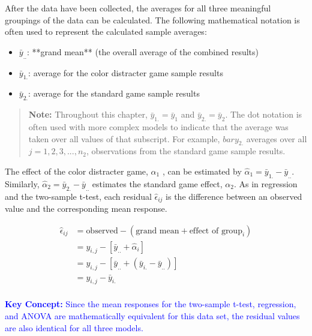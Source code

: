\documentclass[
]{report}
\begin{document}
After the data have been collected, the averages for all three meaningful groupings of the data can be calculated. The following mathematical notation is often used to represent the calculated sample averages:
\vspace{-1em}

\begin{itemize}
\item $\scriptstyle \bar{y}_{..}$: **grand mean** (the overall average of the combined results)
\item $\scriptstyle \bar{y}_{1.}$: average for the color distracter game sample results
\item $\scriptstyle \bar{y}_{2.}$: average for the standard game sample results
\end{itemize}

\begin{quote}
\textbf{Note:} Throughout this chapter, \(\scriptstyle \bar{y}_{1.} = \bar{y}_{1}\) and \(\scriptstyle \bar{y}_{2.} = \bar{y}_{2}\). The dot notation is often used with more complex models to indicate that the average was taken over all values of that subscript. For example, \(\scriptstyle bar{y}_{2.}\) averages over all \(\scriptstyle j = 1, 2, 3, ... , n_2\), observations from the standard game sample results.
\end{quote}

The effect of the color distracter game, \(\scriptstyle \alpha_1\) , can be estimated by \(\scriptstyle \hat{\alpha}_1 = \bar{y}_{1.} - \bar{y}_{..}\). Similarly, \(\scriptstyle \hat{\alpha}_2 = \bar{y}_{2.} - \bar{y}_{..}\)
estimates the standard game effect, \(\scriptstyle \alpha_2\). As in regression and the two-sample t-test, each residual \(\scriptstyle \hat{\epsilon}_{ij}\) is the
difference between an observed value and the corresponding mean response.

\[
\begin{aligned}
\hat{\epsilon}_{ij}  
  &= \text{observed} - (\text{grand mean} + \text{effect of group}_i)\\
  &= y_{i,j} - [\bar{y}_{..} + \hat{\alpha}_i]\\
  &= y_{i,j} - [\bar{y}_{..} + (\bar{y}_{i.} - \bar{y}_{..})]\\
  &= y_{i,j} - \bar{y}_{i.}\\
\end{aligned}  
\]

\textbf{\textcolor{blue}{Key Concept:}}
\textcolor{blue}{Since the mean responses for the two-sample t-test, regression, and ANOVA are mathematically equivalent for this data set, the residual values are also identical for all three models.}
\end{document}
